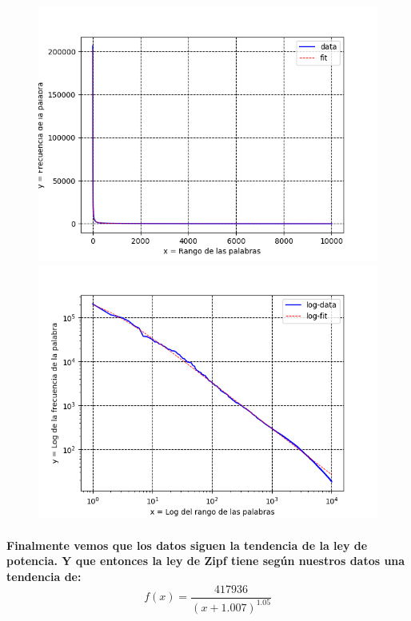 \documentclass{article}
\begin{document}
      \begin{figure}[!tbp]
         \begin{minipage}[b]{0.4\textwidth}
           \includegraphics[width=\textwidth]{novels}
         \end{minipage}
         \hfill
         \begin{minipage}[b]{0.4\textwidth}
           \includegraphics[width=\textwidth]{novels-Log-Log}
         \end{minipage}
      \end{figure}
      \paragraph{
        Finalmente vemos que los datos siguen la tendencia de la ley de potencia.
         Y que entonces la ley de Zipf tiene seg\'un nuestros datos una tendencia de:
         \[ f(x) = {\frac{417936}{(x+1.007)^{1.05}}} \]
       }
\end{document}
